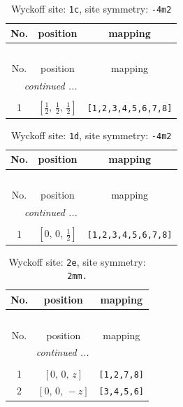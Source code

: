 \documentclass[fleqn,8pt]{jsarticle}
\begin{document}
\begin{longtable}{ccc}
\caption{Wyckoff site: {\tt 1c}, site symmetry: {\tt -4m2}}
 \\
 \hline \hline
No. & position & mapping \\ \hline \endfirsthead

\multicolumn{2}{l}{\tablename\ \thetable{}} \\
 \hline \hline
No. & position & mapping \\ \hline \endhead

 \hline \hline
\multicolumn{2}{r}{\footnotesize\it continued ...} \\ \endfoot

 \hline \hline
\multicolumn{2}{r}{} \\ \endlastfoot

1 & $\left[ \frac{1}{2},\, \frac{1}{2},\, \frac{1}{2} \right]$ & {\tt [1,2,3,4,5,6,7,8]} \\
\end{longtable}
\renewcommand{\arraystretch}{1.2}
\begin{longtable}{ccc}
\caption{Wyckoff site: {\tt 1d}, site symmetry: {\tt -4m2}}
 \\
 \hline \hline
No. & position & mapping \\ \hline \endfirsthead

\multicolumn{2}{l}{\tablename\ \thetable{}} \\
 \hline \hline
No. & position & mapping \\ \hline \endhead

 \hline \hline
\multicolumn{2}{r}{\footnotesize\it continued ...} \\ \endfoot

 \hline \hline
\multicolumn{2}{r}{} \\ \endlastfoot

1 & $\left[ 0,\, 0,\, \frac{1}{2} \right]$ & {\tt [1,2,3,4,5,6,7,8]} \\
\end{longtable}
\renewcommand{\arraystretch}{1.2}
\begin{longtable}{ccc}
\caption{Wyckoff site: {\tt 2e}, site symmetry: {\tt 2mm.}}
 \\
 \hline \hline
No. & position & mapping \\ \hline \endfirsthead

\multicolumn{2}{l}{\tablename\ \thetable{}} \\
 \hline \hline
No. & position & mapping \\ \hline \endhead

 \hline \hline
\multicolumn{2}{r}{\footnotesize\it continued ...} \\ \endfoot

 \hline \hline
\multicolumn{2}{r}{} \\ \endlastfoot

1 & $\left[ 0,\, 0,\, z \right]$ & {\tt [1,2,7,8]} \\ \hline
2 & $\left[ 0,\, 0,\, - z \right]$ & {\tt [3,4,5,6]} \\
\end{longtable}
\end{document}

